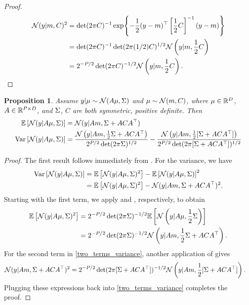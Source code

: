 \documentclass[12pt]{article}
\newtheorem{prop}{Proposition}
\begin{document}
\begin{proof}
\begin{align*}
\mathcal{N}(y | m, C)^2 
&= \det(2\pi C)^{-1} \exp\mathopen{}\left\{-\frac{1}{2} (y - m)^\top \left[\frac{1}{2}C \right]^{-1}(y - m)\right\}\mathclose{} \\
&= \det(2\pi C)^{-1} \det(2\pi (1/2)C)^{1/2} \mathcal{N}\left(y | m, \frac{1}{2}C\right) \\
&= 2^{-P/2} \det(2\pi C)^{-1/2} \mathcal{N}\left(y | m, \frac{1}{2}C\right). 
\end{align*}
\end{proof}

\begin{prop} \label{prop:Gaussian_marginal_moments}
Assume $y | \mu \sim \mathcal{N}(A \mu, \Sigma)$ and $\mu \sim \mathcal{N}(m, C)$, where $\mu \in \mathbb{R}^{D}$, 
$A \in \mathbb{R}^{P \times D}$, and $\Sigma$, $C$ are both symmetric, positive definite. Then 
\begin{align}
\mathbb{E}\left[\mathcal{N}(y | A \mu, \Sigma) \right] &= \mathcal{N}(y | Am, \Sigma + ACA^\top) \\
\mathrm{Var}\left[\mathcal{N}(y | A \mu, \Sigma) \right] 
&= \frac{\mathcal{N}\left(y | Am, \frac{1}{2} \Sigma + ACA^\top \right)}{2^{P/2} \det(2\pi \Sigma)^{1/2}} - 
\frac{\mathcal{N}\left(y | Am, \frac{1}{2}[\Sigma + ACA^\top] \right)}{2^{P/2} \det(2\pi[\Sigma + ACA^\top])^{1/2}}
\end{align}
\end{prop}

\begin{proof} 
The first result follows immediately from . For the variance, we have 
\begin{align}
\mathrm{Var}\left[\mathcal{N}(y | A \mu, \Sigma) \right] 
&= \mathbb{E}\left[\mathcal{N}(y | A \mu, \Sigma)^2 \right] - \mathbb{E}\left[\mathcal{N}(y | A \mu, \Sigma) \right]^2 \nonumber \\
&= \mathbb{E}\left[\mathcal{N}(y | A \mu, \Sigma)^2 \right] - \mathcal{N}(y | Am, \Sigma + ACA^\top)^2. \label{two_terms_variance}
\end{align}
Starting with the first term, we apply  and 
, respectively, to obtain 
\begin{align*}
\mathbb{E}\left[\mathcal{N}(y | A \mu, \Sigma)^2 \right]
&= 2^{-P/2} \det(2\pi \Sigma)^{-1/2} \mathbb{E}\left[\mathcal{N}\left(y | A\mu, \frac{1}{2}\Sigma \right)\right] \\
&= 2^{-P/2} \det(2\pi \Sigma)^{-1/2} \mathcal{N}\left(y | Am, \frac{1}{2}\Sigma + ACA^\top \right).
\end{align*}
For the second term in \ref{two_terms_variance}, another application of  gives
\begin{align*}
\mathcal{N}(y | Am, \Sigma + ACA^\top)^2
&= 2^{-P/2} \det(2\pi[\Sigma + ACA^\top])^{-1/2} \mathcal{N}\left(y | Am, \frac{1}{2}[\Sigma + ACA^\top]\right).
\end{align*}
Plugging these expressions back into \ref{two_terms_variance} completes the proof. 
\end{proof}
\end{document}
